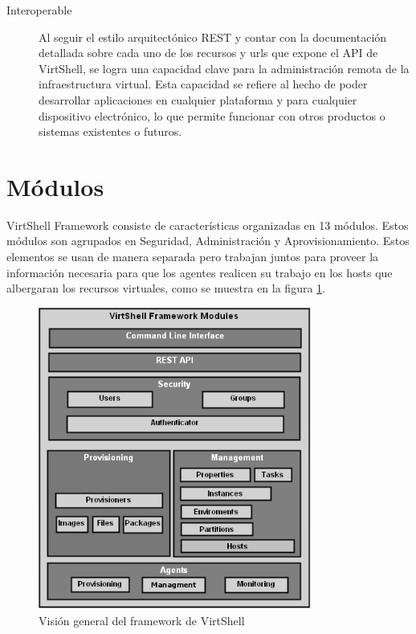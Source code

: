 \begin{description}
\item [Interoperable] Al seguir el estilo arquitectónico REST y contar con la documentación detallada sobre cada uno de los recursos y urls que expone el API de VirtShell, se logra una capacidad clave para la administración remota de la infraestructura virtual. Esta capacidad se refiere al hecho de poder desarrollar aplicaciones en cualquier plataforma y para cualquier dispositivo electrónico, lo que permite funcionar con otros productos o sistemas existentes o futuros.

\end{description}

\section{Módulos}
VirtShell Framework consiste de características organizadas en 13 módulos. Estos módulos son agrupados en Seguridad, Administración y Aprovisionamiento. Estos elementos se usan de manera separada pero trabajan juntos para proveer la información necesaria para que los agentes realicen su trabajo en los hosts que albergaran los recursos virtuales, como se muestra en la figura \ref{fig:framework}. \\

\begin{figure}[h]
    \centering
	\caption{Visión general del framework de VirtShell}
	\label{fig:framework}
	\includegraphics[width = 0.8\textwidth]{../architecture/v1/diagrams/framework}
\end{figure}

